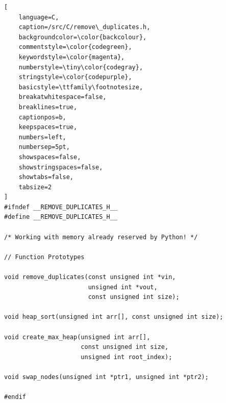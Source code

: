 \documentclass[12 pt]{article}
\begin{document}
\hfill
\begin{lstlisting}[
    language=C,
    caption=/src/C/remove\_duplicates.h,
    backgroundcolor=\color{backcolour},   
    commentstyle=\color{codegreen},
    keywordstyle=\color{magenta},
    numberstyle=\tiny\color{codegray},
    stringstyle=\color{codepurple},
    basicstyle=\ttfamily\footnotesize,
    breakatwhitespace=false,         
    breaklines=true,                 
    captionpos=b,                    
    keepspaces=true,                 
    numbers=left,                    
    numbersep=5pt,                  
    showspaces=false,                
    showstringspaces=false,
    showtabs=false,                  
    tabsize=2
]
#ifndef __REMOVE_DUPLICATES_H__
#define __REMOVE_DUPLICATES_H__

/* Working with memory already reserved by Python! */

// Function Prototypes

void remove_duplicates(const unsigned int *vin,
                       unsigned int *vout,
                       const unsigned int size);               

void heap_sort(unsigned int arr[], const unsigned int size);

void create_max_heap(unsigned int arr[], 
                     const unsigned int size,
                     unsigned int root_index);
                     
void swap_nodes(unsigned int *ptr1, unsigned int *ptr2); 

#endif
\end{lstlisting}
\hfill
\end{document}
